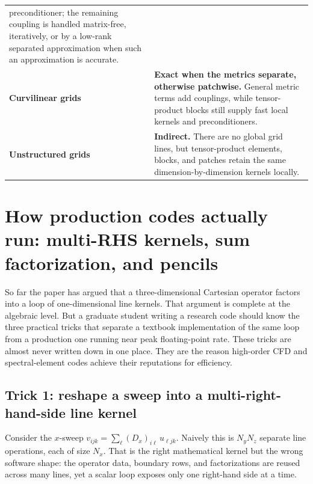 \documentclass[11pt]{article}
\newcommand{\Dx}{D_{x}}
\begin{document}
\begin{tabular}{@{}>{\raggedright\arraybackslash}p{}>{\raggedright\arraybackslash}p{}@{}}
  preconditioner; the remaining coupling is handled matrix-free,
  iteratively, or by a low-rank separated approximation when such an
  approximation is accurate. \\
\addlinespace[5pt]
\textbf{Curvilinear grids} & \textbf{Exact when the metrics separate, otherwise patchwise.}
  General metric terms add couplings, while tensor-product blocks still
  supply fast local kernels and preconditioners. \\
\addlinespace[5pt]
\textbf{Unstructured grids} & \textbf{Indirect.} There are no global grid lines, but
  tensor-product elements, blocks, and patches retain the same
  dimension-by-dimension kernels locally. \\
\bottomrule
\end{tabular}
\normalsize
\medskip


\section{How production codes actually run: multi-RHS kernels, sum factorization, and pencils}
\label{sec:practice}

So far the paper has argued that a three-dimensional Cartesian operator
factors into a loop of one-dimensional line kernels.  That argument is
complete at the algebraic level.  But a graduate student writing a
research code should know the three practical tricks that separate a
textbook implementation of the same loop from a production one running
near peak floating-point rate.  These tricks are almost never written
down in one place.  They are the reason high-order CFD and
spectral-element codes achieve their reputations for efficiency.

\subsection{Trick 1: reshape a sweep into a multi-right-hand-side line kernel}
\label{sec:blas3}

Consider the $x$-sweep $v_{ijk} = \sum_{\ell} (\Dx)_{i\ell}\, u_{\ell j k}$.
Naively this is $N_y N_z$ separate line operations, each of size
$N_x$.  That is the right mathematical kernel but the wrong software
shape: the operator data, boundary rows, and factorizations are reused
across many lines, yet a scalar loop exposes only one right-hand side
at a time.
\end{document}
